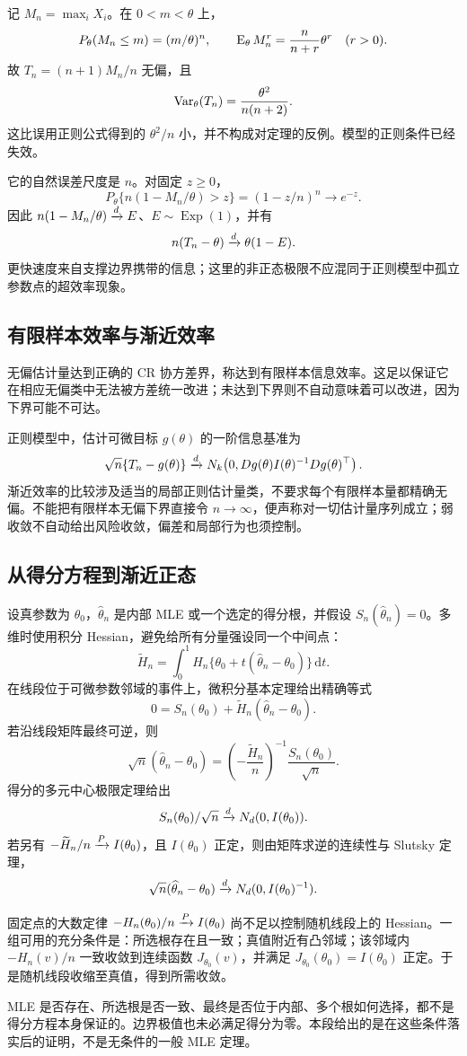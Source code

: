 记 $M_n=\max_iX_i$。在 $0<m<\theta$ 上，
\[
 P_\theta(M_n\le m)=(m/\theta)^n,\qquad
 \operatorname{E}_\theta M_n^r=\frac n{n+r}\theta^r\quad(r>0).
\]
故 $T_n=(n+1)M_n/n$ 无偏，且
\[
 \operatorname{Var}_\theta(T_n)=\frac{\theta^2}{n(n+2)}.
\]
这比误用正则公式得到的 $\theta^2/n$ 小，并不构成对定理的反例。模型的正则条件已经失效。

它的自然误差尺度是 $n$。对固定 $z\ge0$，
\[
 P_\theta\{n(1-M_n/\theta)>z\}
 =(1-z/n)^n\to e^{-z}.
\]
因此 $n(1-M_n/\theta)\xrightarrow{d} E$、$E\sim\operatorname{Exp}(1)$，并有
\[
 n(T_n-\theta)\xrightarrow{d}\theta(1-E).
\]
更快速度来自支撑边界携带的信息；这里的非正态极限不应混同于正则模型中孤立参数点的超效率现象。

\subsection{有限样本效率与渐近效率}
无偏估计量达到正确的 CR 协方差界，称达到有限样本信息效率。这足以保证它在相应无偏类中无法被方差统一改进；未达到下界则不自动意味着可以改进，因为下界可能不可达。

正则模型中，估计可微目标 $g(\theta)$ 的一阶信息基准为
\[
 \sqrt n\{T_n-g(\theta)\}
 \xrightarrow{d} N_k\!\left(0,Dg(\theta)I(\theta)^{-1}Dg(\theta)^\top\right).
\]
渐近效率的比较涉及适当的局部正则估计量类，不要求每个有限样本量都精确无偏。不能把有限样本无偏下界直接令 $n\to\infty$，便声称对一切估计量序列成立；弱收敛不自动给出风险收敛，偏差和局部行为也须控制。

\subsection{从得分方程到渐近正态}
设真参数为 $\theta_0$，$\widehat\theta_n$ 是内部 MLE 或一个选定的得分根，并假设 $S_n(\widehat\theta_n)=0$。多维时使用积分 Hessian，避免给所有分量强设同一个中间点：
\[
 \widetilde H_n=
 \int_0^1H_n\{\theta_0+t(\widehat\theta_n-\theta_0)\}\,\mathrm dt.
\]
在线段位于可微参数邻域的事件上，微积分基本定理给出精确等式
\[
 0=S_n(\theta_0)+\widetilde H_n(\widehat\theta_n-\theta_0).
\]
若沿线段矩阵最终可逆，则
\[
 \sqrt n(\widehat\theta_n-\theta_0)
 =\left(-\frac{\widetilde H_n}{n}\right)^{-1}
 \frac{S_n(\theta_0)}{\sqrt n}.
\]
得分的多元中心极限定理给出
\[
 S_n(\theta_0)/\sqrt n\xrightarrow{d} N_d(0,I(\theta_0)).
\]
若另有 $-\widetilde H_n/n\xrightarrow{P} I(\theta_0)$，且 $I(\theta_0)$ 正定，则由矩阵求逆的连续性与 Slutsky 定理，
\[
 \sqrt n(\widehat\theta_n-\theta_0)
 \xrightarrow{d} N_d(0,I(\theta_0)^{-1}).
\]

\begin{notebox}[展开之外必须补的条件]
固定点的大数定律 $-H_n(\theta_0)/n\xrightarrow{P} I(\theta_0)$ 尚不足以控制随机线段上的 Hessian。一组可用的充分条件是：所选根存在且一致；真值附近有凸邻域；该邻域内 $-H_n(v)/n$ 一致收敛到连续函数 $J_{\theta_0}(v)$，并满足 $J_{\theta_0}(\theta_0)=I(\theta_0)$ 正定。于是随机线段收缩至真值，得到所需收敛。

MLE 是否存在、所选根是否一致、最终是否位于内部、多个根如何选择，都不是得分方程本身保证的。边界极值也未必满足得分为零。本段给出的是在这些条件落实后的证明，不是无条件的一般 MLE 定理。
\end{notebox}

